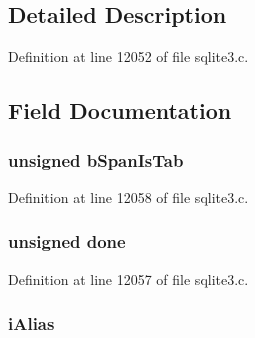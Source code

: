 \subsection{Detailed Description}


Definition at line 12052 of file sqlite3.\+c.



\subsection{Field Documentation}
\hypertarget{struct_expr_list_1_1_expr_list__item_a2d1fb192f830751eb7dd8f77bd62cd90}{}
\subsubsection[{b\+Span\+Is\+Tab}]{\setlength{\rightskip}{0pt plus 5cm}unsigned b\+Span\+Is\+Tab}\label{struct_expr_list_1_1_expr_list__item_a2d1fb192f830751eb7dd8f77bd62cd90}


Definition at line 12058 of file sqlite3.\+c.

\hypertarget{struct_expr_list_1_1_expr_list__item_aa195dadf0a13af092bd974c517f76f66}{}
\subsubsection[{done}]{\setlength{\rightskip}{0pt plus 5cm}unsigned done}\label{struct_expr_list_1_1_expr_list__item_aa195dadf0a13af092bd974c517f76f66}


Definition at line 12057 of file sqlite3.\+c.

\hypertarget{struct_expr_list_1_1_expr_list__item_af91907a41864a1cd92daea4792728ee4}{}
\subsubsection[{i\+Alias}]{ i\+Alias}\label{struct_expr_list_1_1_expr_list__item_af91907a41864a1cd92daea4792728ee4}


